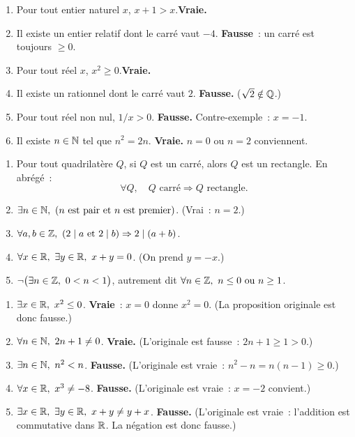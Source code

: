 \begin{enumerate}
  \item \og Pour tout entier naturel $x$, $x+1>x$.\fg\enspace \textbf{Vraie.}
  \item \og Il existe un entier relatif dont le carr\'e vaut $-4$.\fg\enspace
        \textbf{Fausse}~: un carr\'e est toujours $\geq0$.
  \item \og Pour tout r\'eel $x$, $x^2\geq0$.\fg\enspace \textbf{Vraie.}
  \item \og Il existe un rationnel dont le carr\'e vaut $2$.\fg\enspace
        \textbf{Fausse.} ($\sqrt{2}\notin\mathbb{Q}$.)
  \item \og Pour tout r\'eel non nul, $1/x>0$.\fg\enspace
        \textbf{Fausse.} Contre-exemple~: $x=-1$.
  \item \og Il existe $n\in\mathbb{N}$ tel que $n^2=2n$.\fg\enspace
        \textbf{Vraie.} $n=0$ ou $n=2$ conviennent.
\end{enumerate}


\begin{enumerate}
  \item Pour tout quadrilat\`ere $Q$, si $Q$ est un carr\'e, alors $Q$ est un rectangle.
        En abr\'eg\'e~:
        \[\forall Q,\quad Q\text{ carr\'e}\Rightarrow Q\text{ rectangle}.\]
  \item $\exists n\in\mathbb{N},\ (n \text{ est pair et } n \text{ est premier})$.
        (Vrai~: $n=2$.)
  \item $\forall a,b\in\Z,\ (2\mid a\ \text{et}\ 2\mid b)\Rightarrow 2\mid(a+b)$.
  \item $\forall x\in\R,\ \exists y\in\R,\ x+y=0$. (On prend $y=-x$.)
  \item $\lnot\bigl(\exists n\in\Z,\ 0<n<1\bigr)$, autrement dit
        $\forall n\in\Z,\ n\leq0\ \text{ou}\ n\geq1$.
\end{enumerate}


\begin{enumerate}
  \item $\exists x\in\mathbb{R},\ x^2\leq0$. \textbf{Vraie}~: $x=0$ donne $x^2=0$.
        (La proposition originale est donc fausse.)
  \item $\forall n\in\mathbb{N},\ 2n+1\ne0$. \textbf{Vraie.}
        (L'originale est fausse~: $2n+1\geq1>0$.)
  \item $\exists n\in\mathbb{N},\ n^2<n$. \textbf{Fausse.}
        (L'originale est vraie~: $n^2-n=n(n-1)\geq0$.)
  \item $\forall x\in\mathbb{R},\ x^3\ne-8$. \textbf{Fausse.}
        (L'originale est vraie~: $x=-2$ convient.)
  \item $\exists x\in\R,\ \exists y\in\R,\ x+y\ne y+x$. \textbf{Fausse.}
        (L'originale est vraie~: l'addition est commutative dans $\mathbb{R}$.
        La n\'egation est donc fausse.)
\end{enumerate}

